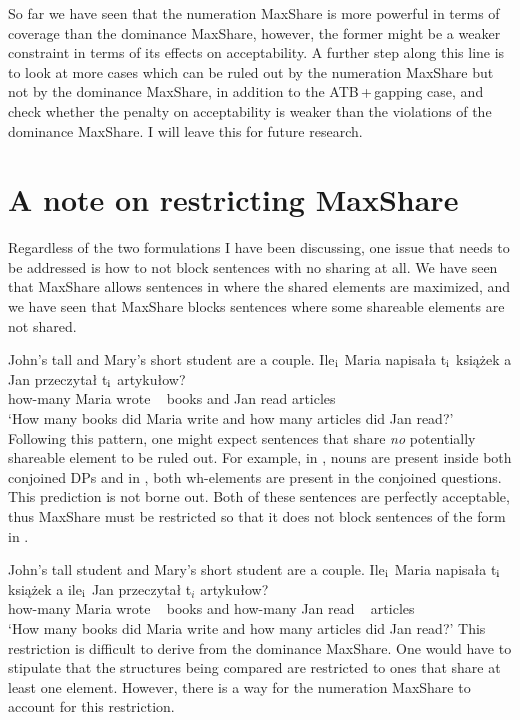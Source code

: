 \documentclass[output=paper]{langscibook}
\begin{document}
So far we have seen that the numeration MaxShare is more powerful in terms of coverage than the dominance MaxShare, however, the former might be a weaker constraint in terms of its effects on acceptability. A further step along this line is to look at more cases which can be ruled out by the numeration MaxShare but not by the dominance MaxShare, in addition to the ATB\,+\,gapping case, and check whether the penalty on acceptability is weaker than the violations of the dominance MaxShare. I will leave this for future research.

\section{A note on restricting MaxShare}
\label{shensect:restrict}

Regardless of the two formulations I have been discussing, one issue that needs to be addressed is how to not block sentences with no sharing at all. We have seen that MaxShare allows sentences in  where the shared elements are maximized, and we have seen that MaxShare blocks sentences where some shareable elements are not shared. 

\ea
	\label{shenex20}
	\ea 
		John's tall and Mary's short student are a couple.
	\ex 
		\gll Ile$_{\textnormal{i}}$ Maria napisała t$_{\textnormal{i}}$ ksią\.z{}ek a Jan przeczytał t$_{\textnormal{i}}$ artykułow?\\
		how-many Maria wrote {~} books and Jan read {} articles\\
		\glt `How many books did Maria write and how many articles did Jan read?'
	\z 
\z 
Following this pattern, one might expect sentences that share \textit{no} potentially shareable element to be ruled out. For example, in , nouns are present inside both conjoined DPs and in , both wh-elements are present in the conjoined questions. This prediction is not borne out. Both of these sentences are perfectly acceptable, thus MaxShare must be restricted so that it does not block sentences of the form in . 
 
\ea 
	\label{shenex21}
	\ea 
		\label{shenex21:a}
		John's tall student and Mary's short student are a couple.
	\ex 
		\label{shenex21:b}
		\gll Ile$_{\textnormal{i}}$ Maria napisała t$_{\textnormal{i}}$ ksią\.z{}ek a ile$_{\textnormal{i}}$  Jan przeczytał t$_i$ artykułow? \\
		how-many Maria wrote {~} books and how-many Jan read {~} articles\\
		\glt `How many books did Maria write and how many articles did Jan read?'
	\z 
\z 
This restriction is difficult to derive from the dominance MaxShare. One would have to stipulate that the structures being compared are restricted to ones that share at least one element. However, there is a way for the numeration MaxShare to account for this restriction. 
\end{document}
